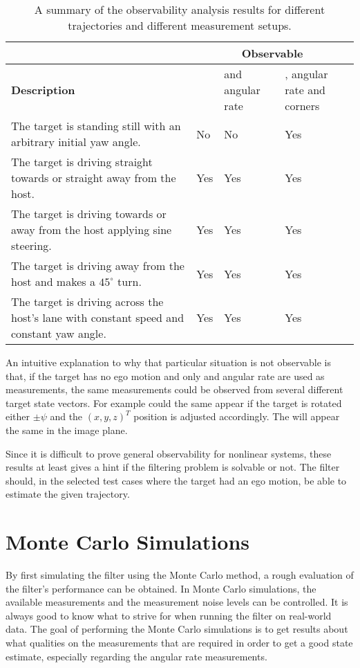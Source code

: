 \begin{table}[!ht]
	\centering
	\caption{\label{tab:observabilityresult} A summary of the observability analysis results for different trajectories and different measurement setups.}
	\begin{tabular}{|p{5cm}|p{1cm}|p{2cm}|p{2.5cm}|}
		\cline{2-4}
		\multicolumn{1}{c|}{} & \multicolumn{3}{c|}{\textbf{Observable}} \\
		\hline
		\textbf{Description} & \abbrROI & \abbrROI and angular rate & \abbrROI, angular rate and corners \\
		\hline
		The target is standing still with an arbitrary initial yaw angle. & No & No & Yes \\
		\hline
		The target is driving straight towards or straight away from the host. & Yes & Yes & Yes \\
		\hline
		The target is driving towards or away from the host applying sine steering. & Yes & Yes & Yes \\
		\hline
		The target is driving away from the host and makes a $45^\circ$ turn. & Yes & Yes & Yes \\
		\hline
		The target is driving across the host's lane with constant speed and constant yaw angle. & Yes & Yes & Yes \\
		\hline
	\end{tabular}
\end{table}

An intuitive explanation to why that particular situation is not observable is that, if the target has no ego motion and only \abbrROI and angular rate are used as measurements, the same \abbrROI measurements could be observed from several different target state vectors.
For example could the same \abbrROI appear if the target is rotated either $\pm\psi$ and the $(x,y,z)^T$ position is adjusted accordingly.
The \abbrROI will appear the same in the image plane.

Since it is difficult to prove general observability for nonlinear systems, these results at least gives a hint if the filtering problem is solvable or not.
The filter should, in the selected test cases where the target had an ego motion, be able to estimate the given trajectory.

\newpage

\section{Monte Carlo Simulations}
\label{sec:montecarloresult}
By first simulating the filter using the Monte Carlo method, a rough evaluation of the filter's performance can be obtained.
In Monte Carlo simulations, the available measurements and the measurement noise levels can be controlled.
It is always good to know what to strive for when running the filter on real-world data.
The goal of performing the Monte Carlo simulations is to get results about what qualities on the measurements that are required in order to get a good state estimate, especially regarding the angular rate measurements.

